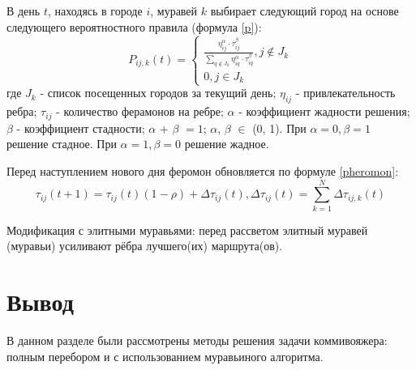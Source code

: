В день $t$, находясь в городе $i$, муравей $k$ выбирает следующий город на основе следующего вероятностного правила (формула \ref{p}):
\begin{equation}
    \label{p}
    P_{ij,k}(t) = \begin{cases}
		\frac{\eta_{ij}^{\alpha}\cdot\tau_{ij}^{\beta}}{\sum_{q\notin J_k} \eta^\alpha_{iq}\cdot\tau^\beta_{iq}}, j \notin J_k \\
		0, j \in J_k
	\end{cases}
\end{equation}
где $J_k$ - список посещенных городов за текущий день; ${\eta_{ij}}$ - привлекательность ребра; ${\tau_{ij}}$ - количество ферамонов на ребре; ${\alpha}$ - коэффициент жадности решения; ${\beta}$ - коэффициент стадности; ${\alpha}$ $+$ ${\beta}$ $ = 1$; ${\alpha}$, ${\beta}$ ${\in}$ (0, 1).
При ${\alpha} = 0, {\beta} = 1$ решение стадное. При ${\alpha} = 1, {\beta} = 0$ решение жадное.

Перед наступлением нового дня феромон обновляется по формуле \ref{pheromon}:
\begin{equation}
    \label{pheromon}
    {\tau_{ij}}(t + 1) = {\tau_{ij}}(t)(1 - \rho) + {\Delta\tau_{ij}}(t), {\Delta\tau_{ij}}(t) = \sum_{k=1}^N\Delta\tau_{ij,k}(t)
\end{equation}

Модификация с элитными муравьями: перед рассветом элитный муравей (муравьи) усиливают рёбра лучшего(их) маршрута(ов).
\section*{Вывод}
В данном разделе были рассмотрены методы решения задачи коммивояжера: полным перебором и с использованием муравьиного алгоритма.

